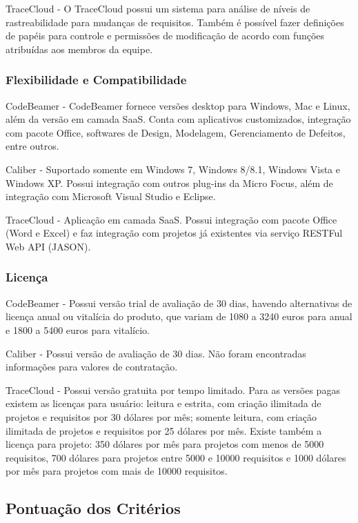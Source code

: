 TraceCloud - O TraceCloud possui um sistema para análise de níveis de rastreabilidade para mudanças de requisitos. Também é possível fazer definições de papéis para controle e permissões de modificação de acordo com funções atribuídas aos membros da equipe.

\subsubsection{Flexibilidade e Compatibilidade}

CodeBeamer - CodeBeamer fornece versões desktop para Windows, Mac e Linux, além da versão em camada SaaS. Conta com aplicativos customizados, integração com pacote Office, softwares de Design, Modelagem, Gerenciamento de Defeitos, entre outros.

Caliber - Suportado somente em Windows 7, Windows 8/8.1, Windows Vista e Windows XP. Possui integração com outros plug-ins da Micro Focus, além de integração com Microsoft Visual Studio e Eclipse.

TraceCloud - Aplicação em camada SaaS. Possui integração com pacote Office (Word e Excel) e faz integração com projetos já existentes via serviço RESTFul Web API (JASON).

\subsubsection{Licença}

CodeBeamer - Possui versão trial de avaliação de 30 dias, havendo alternativas de licença anual ou vitalícia do produto, que variam de 1080 a 3240 euros para anual e 1800 a 5400 euros para vitalício.

Caliber - Possui versão de avaliação de 30 dias. Não foram encontradas informações para valores de contratação.

TraceCloud - Possui versão gratuita por tempo limitado. Para as versões pagas existem as licenças para usuário: leitura e estrita, com criação ilimitada de projetos e requisitos por 30 dólares por mês; somente leitura, com criação ilimitada de projetos e requisitos por 25 dólares por mês. Existe também a licença para projeto: 350 dólares por mês para projetos com menos de 5000 requisitos, 700 dólares para projetos entre 5000 e 10000 requisitos e 1000 dólares por mês para projetos com mais de 10000 requisitos.

\subsection{Pontuação dos Critérios}

